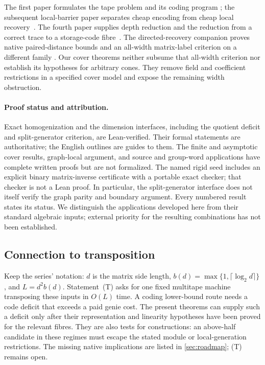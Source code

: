 The first paper formulates the tape problem and its coding program
\cite{BrendeTapeCoding}; the subsequent local-barrier paper separates
cheap encoding from cheap local recovery~\cite{BrendeLocalCoding}.
The fourth paper supplies depth reduction and the reduction from a
correct trace to a storage-code fibre~\cite{BrendeCurved}.
The directed-recovery companion proves native paired-distance bounds
and an all-width matrix-label criterion on a different family
\cite{BrendeDirected}. Our cover theorems neither subsume that
all-width criterion nor establish its hypotheses for arbitrary cones.
They remove field and coefficient restrictions in a specified cover
model and expose the remaining width obstruction.

\paragraph{Proof status and attribution.}
Exact homogenization and the dimension interfaces, including the quotient
deficit and split-generator criterion, are Lean-verified. Their formal
statements are authoritative; the English outlines are guides to them.
The finite and asymptotic cover results, graph-local argument, and source
and group-word applications have complete written proofs but are not formalized.
The named rigid seed includes an explicit binary matrix-inverse certificate
with a portable exact checker; that checker is not a Lean proof.
In particular, the split-generator
interface does not itself verify the graph parity and boundary argument.
Every numbered result states its status. We distinguish the applications
developed here from their standard algebraic inputs; external priority for
the resulting combinations has not been established.

\subsection{Connection to transposition}
Keep the series' notation: $d$ is the matrix side length,
$b(d)=\max\{1,\lceil\log_2d\rceil\}$, and $L=d^2b(d)$.
Statement~(T) asks for one fixed multitape machine transposing these
inputs in $O(L)$ time. A coding lower-bound route needs a code deficit
that exceeds a paid genie cost. The present theorems can supply such a
deficit only after their representation and linearity hypotheses have
been proved for the relevant fibres. They are also tests for constructions:
an above-half candidate in these regimes must escape the stated module
or local-generation restrictions. The missing native implications are
listed in \cref{sec:roadmap}; (T) remains open.
